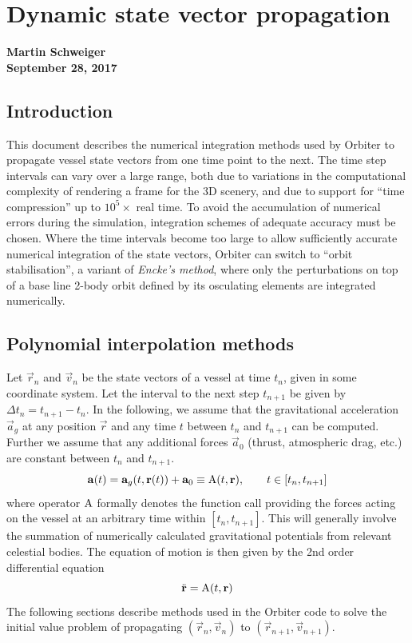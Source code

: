 \documentclass[Orbiter Technical Reference.tex]{subfiles}
\begin{document}
\section{Dynamic state vector propagation}
\textbf{Martin Schweiger}\\
\textbf{September 28, 2017}


\subsection{Introduction}
This document describes the numerical integration methods used by Orbiter to propagate vessel state vectors from one time point to the next. The time step intervals can vary over a large range, both due to variations in the computational complexity of rendering a frame for the 3D scenery, and due to support for ``time compression'' up to $10^5 \times$ real time.
To avoid the accumulation of numerical errors during the simulation, integration schemes of adequate accuracy must be chosen.
Where the time intervals become too large to allow sufficiently accurate numerical integration of the state vectors, Orbiter can switch to ``orbit stabilisation'', a variant of \emph{Encke's method}, where only the perturbations on top of a base line 2-body orbit defined by its osculating elements are integrated numerically.

\subsection{Polynomial interpolation methods}
Let $\vec{r}_n$ and $\vec{v}_n$ be the state vectors of a vessel at time $t_n$, given in some coordinate system. Let the interval to the next step $t_{n+1}$ be given by $\Delta t_n = t_{n+1}-t_n$.
 In the following, we assume that the gravitational acceleration $\vec{a}_g$ at any position $\vec{r}$ and any time $t$ between $t_n$ and $t_{n+1}$ can be computed. Further we assume that any additional forces $\vec{a}_0$ (thrust, atmospheric drag, etc.) are constant between $t_n$ and $t_{n+1}$.
\begin{equation*}
\mathbf{a}(t) = \mathbf{a}_g(t,\mathbf{r}(t)) + \mathbf{a}_0 \equiv \mathrm{A}(t,\mathbf{r}),\qquad t \in [t_n, t_{n+1}]
\end{equation*}
where operator $\mathrm{A}$ formally denotes the function call providing the forces acting on the vessel at an arbitrary time within $[t_n, t_{n+1}]$.
This will generally involve the summation of numerically calculated gravitational potentials from relevant celestial bodies.
The equation of motion is then given by the 2nd order differential equation
\begin{equation}\label{eq:motion}
\ddot{\mathbf{r}} = \mathrm{A}(t,\mathbf{r})
\end{equation}
The following sections describe methods used in the Orbiter code to solve the initial value problem of propagating $(\vec{r}_n,\vec{v}_n)$ to $(\vec{r}_{n+1},\vec{v}_{n+1})$.
\end{document}
